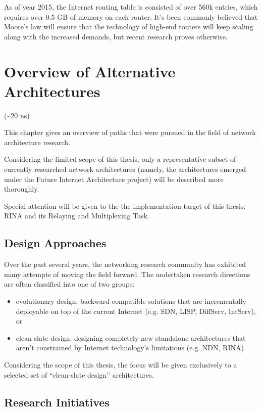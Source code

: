         As of year 2015, the Internet routing table is consisted of over 560k entries, which requires over 0.5 GB of memory on each router. It's been commonly believed that Moore's law will ensure that the technology of high-end routers will keep scaling along with the increased demands, but recent research proves otherwise.

\chapter{Overview of Alternative Architectures}
    (\textasciitilde20 ns)

    This chapter gives an overview of paths that were pursued in the field of network architecture research.

    Considering the limited scope of this thesis, only a representative subset of currently researched network architectures (namely, the architectures emerged under the Future Internet Architecture project) will be described more thoroughly.

    Special attention will be given to the the implementation target of this thesis: RINA and its Relaying and Multiplexing Task.

    \section{Design Approaches}

        Over the past several years, the networking research community has exhibited many attempts of moving the field forward. The undertaken research directions are often classified into one of two groups:

        \begin{itemize}
            \item evolutionary design: backward-compatible solutions that are incrementally deployable on top of the current Internet (e.g. SDN, LISP, DiffServ, IntServ), or
            \item clean slate design: designing completely new standalone architectures that aren't constrained by Internet technology's limitations (e.g. NDN, RINA)
        \end{itemize}

        Considering the scope of this thesis, the focus will be given exclusively to a selected set of ``clean-slate design'' architectures.

    \section{Research Initiatives}

